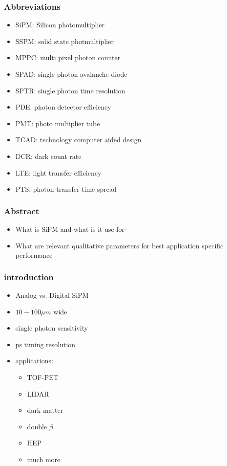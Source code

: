 \documentclass{beamer}
\begin{document}
\begin{frame}
\frametitle{Abbreviations}
  \begin{itemize}
    \item SiPM: Silicon photomultiplier
    \item SSPM: solid state photmultiplier
    \item MPPC: multi pixel photon counter
    \item SPAD: single photon avalanche diode
    \item SPTR: single photon time resolution
    \item PDE: photon detector efficiency
    \item PMT: photo multiplier tube
    \item TCAD: technology computer aided design
    \item DCR: dark count rate
    \item LTE: light transfer efficiency
    \item PTS: photon transfer time spread
  \end{itemize}
\end{frame}



\begin{frame}
  \frametitle{Abstract}
  \begin{itemize}
    \item What is SiPM and what is it use for
    \item What are relevant qualitative parameters for best application specific performance
  \end{itemize}
\end{frame}

\begin{frame}
\frametitle{introduction}
  \begin{itemize}
    \item Analog vs. Digital SiPM
    \item $10-100\mu m$ wide
    \item single photon sensitivity
    \item ps timing resolution
    \item applications:
    \begin{itemize}
      \item TOF-PET
      \item LIDAR
      \item dark matter
      \item double $\beta$
      \item HEP
      \item much more
    \end{itemize}
  \end{itemize}
\end{frame}
\end{document}

